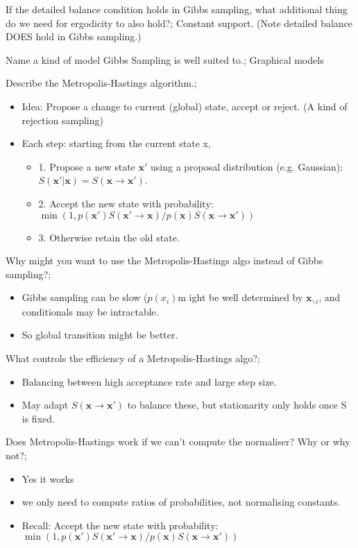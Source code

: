 \documentclass{article}
\begin{document}
If the detailed balance condition holds in Gibbs sampling, what additional thing do we need for ergodicity to also hold?; Constant support. (Note detailed balance DOES hold in Gibbs sampling.)

Name a kind of model Gibbs Sampling is well suited to.; Graphical models

Describe the Metropolis-Hastings algorithm.; \begin{itemize} \item Idea: Propose a change to current (global) state, accept or reject. (A kind of rejection sampling) \item Each step: starting from the current state x, \begin{itemize} \item 1. Propose a new state $\mathbf{x'}$ using a proposal distribution (e.g. Gaussian): $S(\mathbf{x'|x}) = S(\mathbf{x\rightarrow x'})$. \item 2. Accept the new state with probability: $\min (1, p(\mathbf{x'})S(\mathbf{x'\rightarrow x})/p(\mathbf{x})S(\mathbf{x}\rightarrow \mathbf{x'}))$ \item 3. Otherwise retain the old state. \end{itemize} \end{itemize}

Why might you want to use the Metropolis-Hastings algo instead of Gibbs sampling?; \begin{itemize} \item Gibbs sampling can be slow ($p(x_i)$m ight be well determined by $\mathbf{x}_{\backslash i}$, and conditionals may be intractable. \item So global transition might be better. \end{itemize}

What controls the efficiency of a Metropolis-Hastings algo?; \begin{itemize} \item Balancing between high acceptance rate and large step size. \item May adapt $S(\mathbf{x\rightarrow x'})$ to balance these, but stationarity only holds once S is fixed. \end{itemize}

Does Metropolis-Hastings work if we can't compute the normaliser? Why or why not?; \begin{itemize} \item Yes it works \item we only need to compute ratios of probabilities, not normalising constants. \item Recall: Accept the new state with probability: $\min (1, p(\mathbf{x'})S(\mathbf{x'\rightarrow x})/p(\mathbf{x})S(\mathbf{x}\rightarrow \mathbf{x'}))$ \end{itemize}
\end{document}
